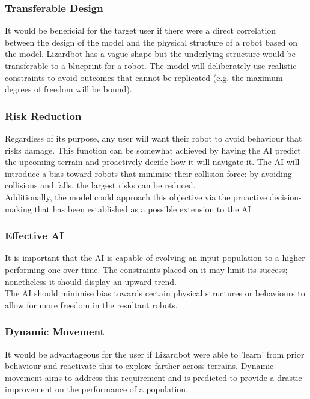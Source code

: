 \documentclass{article}
\begin{document}
\subsubsection{Transferable Design}
\label{sec:Transferable Design}
It would be beneficial for the target user if there were a direct correlation between the design of the model and the physical structure of a robot based on the model. Lizardbot has a vague shape but the underlying structure would be transferable to a blueprint for a robot. The model will deliberately use realistic constraints to avoid outcomes that cannot be replicated (e.g. the maximum degrees of freedom will be bound).

\subsubsection{Risk Reduction}
\label{sec:Risk Reduction}
Regardless of its purpose, any user will want their robot to avoid behaviour that risks damage. This function can be somewhat achieved by having the AI predict the upcoming terrain and proactively decide how it will navigate it. The AI will introduce a bias toward robots that minimise their collision force: by avoiding collisions and falls, the largest risks can be reduced. \\
Additionally, the model could approach this objective via the proactive decision-making that has been established as a possible extension to the AI.

\subsubsection{Effective AI}
\label{sec:Effective AI}
It is important that the AI is capable of evolving an input population to a higher performing one over time. The constraints placed on it may limit its success; nonetheless it should display an upward trend.\\ The AI should minimise bias towards certain physical structures or behaviours to allow for more freedom in the resultant robots. 

\subsubsection{Dynamic Movement}
\label{sec:Dynamic Movement Req}
It would be advantageous for the user if Lizardbot were able to 'learn' from prior behaviour and reactivate this to explore farther across terrains. Dynamic movement aims to address this requirement and is predicted to provide a drastic improvement on the performance of a population.
\end{document}
